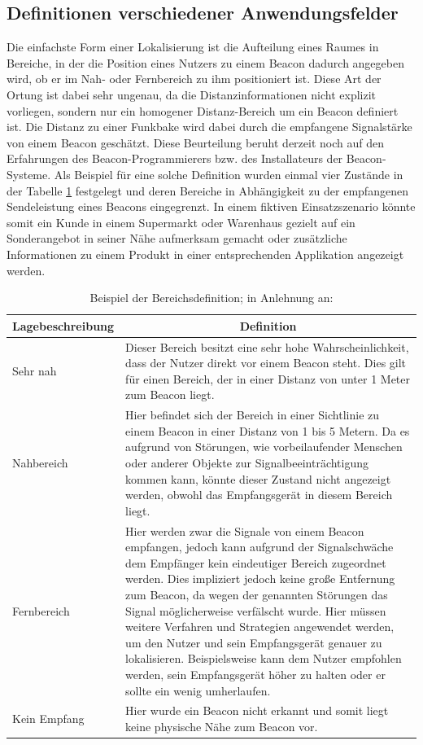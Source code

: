 \subsection{Definitionen verschiedener Anwendungsfelder}
Die einfachste Form einer Lokalisierung ist die Aufteilung eines Raumes in Bereiche, in der die Position eines Nutzers zu einem Beacon dadurch angegeben wird, ob er im Nah- oder Fernbereich zu ihm positioniert ist. Diese Art der Ortung ist dabei sehr ungenau, da die Distanzinformationen nicht explizit vorliegen, sondern nur ein homogener Distanz-Bereich um ein Beacon definiert ist. Die Distanz zu einer Funkbake wird dabei durch die empfangene Signalstärke von einem Beacon geschätzt. Diese Beurteilung beruht derzeit noch auf den Erfahrungen des Beacon-Programmierers bzw. des Installateurs der Beacon-Systeme. Als Beispiel für eine solche Definition wurden einmal vier Zustände in der Tabelle \ref{table:Ranging} festgelegt und deren Bereiche in Abhängigkeit zu der empfangenen Sendeleistung eines Beacons eingegrenzt. In einem fiktiven Einsatzszenario könnte somit ein Kunde in einem Supermarkt oder Warenhaus gezielt auf ein Sonderangebot in seiner Nähe aufmerksam gemacht oder zusätzliche Informationen zu einem Produkt in einer entsprechenden Applikation angezeigt werden.    
\begin{table}[H]
\centering
\begin{tabular}{|>{\centering}p{4cm}|m{12cm}|}
\hline
\rowcolor{gray} \textbf{Lagebeschreibung} & \multicolumn{1}{c}{\textbf{Definition}} \\ \hline
Sehr nah & Dieser Bereich besitzt eine sehr hohe Wahrscheinlichkeit, dass der Nutzer direkt vor einem Beacon steht. Dies gilt für einen Bereich, der in einer Distanz von unter 1 Meter zum Beacon liegt. \\ \hline
Nahbereich & Hier befindet sich der Bereich in einer Sichtlinie zu einem Beacon in einer Distanz von 1 bis 5 Metern. Da es aufgrund von Störungen, wie vorbeilaufender Menschen oder anderer Objekte zur Signalbeeinträchtigung kommen kann, könnte dieser Zustand nicht angezeigt werden, obwohl das Empfangsgerät in diesem Bereich liegt.\\ \hline
Fernbereich & Hier werden zwar die Signale von einem Beacon empfangen, jedoch kann aufgrund der Signalschwäche dem Empfänger kein eindeutiger Bereich zugeordnet werden. Dies impliziert jedoch keine große Entfernung zum Beacon, da wegen der genannten Störungen das Signal möglicherweise verfälscht wurde. Hier müssen weitere Verfahren und Strategien angewendet werden, um den Nutzer und sein Empfangsgerät genauer zu lokalisieren. Beispielsweise kann dem Nutzer empfohlen werden, sein Empfangsgerät höher zu halten oder er sollte ein wenig umherlaufen.\\ \hline
Kein Empfang & Hier wurde ein Beacon nicht erkannt und somit liegt keine physische Nähe zum Beacon vor.\\ \hline
\end{tabular}
\caption{Beispiel der Bereichsdefinition; in Anlehnung an: \cite{GSwiB}}
\label{table:Ranging}
\end{table}
